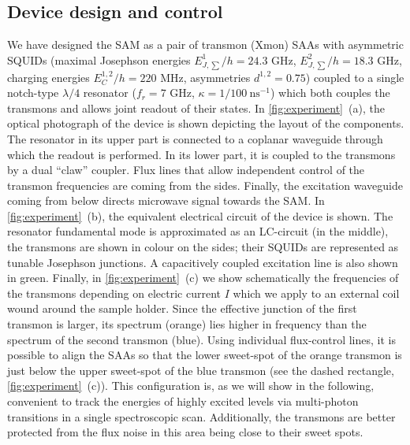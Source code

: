 \documentclass[%
 pra,
 amsmath,amssymb,
 reprint,%
]{revtex4-1}
\begin{document}
\subsection{Device design and control}
We have designed the SAM as a pair of transmon 
(Xmon) SAAs with asymmetric 
SQUIDs\cite{hutchings2017tunable} (maximal Josephson energies $E^1_{J, 
\sum}/h = 24.3$ GHz, $E^2_{J,\sum}/h = 18.3$ GHz, 
charging energies $E^{1,2}_C/h = 220$ MHz, asymmetries $d^{1,2} =0.75$) coupled 
to a single notch-type\cite{probst2015efficient} 
$\lambda/4$ resonator ($f_r = 7$ GHz, $\kappa = 
1/100\ \text{ns}^{-1}$) which both 
couples\cite{majer2007coupling} the transmons and 
allows joint\cite{chow2010detecting} readout of 
their states. In \autoref{fig:experiment}~(a), 
the optical photograph of the device is shown 
depicting the layout of the components. The 
resonator in its upper part is connected to a 
coplanar waveguide through which the readout is 
performed. In its lower part, it is coupled to 
the transmons by a dual 
``claw''\cite{barends2013coherent} coupler. Flux 
lines that allow independent control of the 
transmon frequencies are coming from the sides. 
Finally, the excitation waveguide coming from 
below directs microwave signal towards the SAM. 
In \autoref{fig:experiment}~(b), the equivalent 
electrical circuit of the device is shown. The 
resonator fundamental mode is approximated as an 
LC-circuit (in the middle), the transmons are 
shown in colour on the sides; their SQUIDs are 
represented as tunable Josephson junctions. A 
capacitively coupled excitation line is also 
shown in green. Finally, in 
\autoref{fig:experiment}~(c) we show 
schematically the frequencies of the transmons 
depending on electric current $I$ which we apply 
to an external coil wound around the sample 
holder. Since the effective junction of the first 
transmon is larger, its spectrum (orange) lies 
higher in frequency than the spectrum of the 
second transmon (blue). Using individual 
flux-control lines, it is possible to align the 
SAAs so that the lower sweet-spot of the orange 
transmon is just below the upper sweet-spot of 
the blue transmon (see the dashed rectangle,  
\autoref{fig:experiment}~(c)). This configuration 
is, as we will show in the following, convenient 
to track the energies of highly excited levels 
via multi-photon transitions in a single 
spectroscopic scan. Additionally, the transmons 
are better protected from the flux noise in this 
area being close to their sweet spots.
\end{document}
